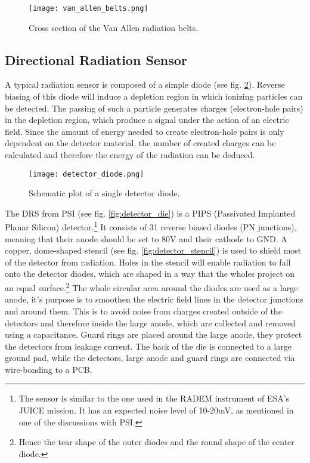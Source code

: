 \begin{figure}[H]
    \centering
    \texttt{[image: van\_allen\_belts.png]}
    \caption[Van Allen Radiation Belts]{Cross section of the Van Allen radiation belts.\cite{wikipedia2016vanallen}}
    \label{fig:van_allen_belts}
\end{figure}

\subsection{Directional Radiation Sensor}
\label{sec:radiation_sensor}
A typical radiation sensor is composed of a simple diode (see fig. \ref{fig:detector_diode}).
Reverse biasing of this diode will induce a depletion region in which ionizing particles can be detected.
The passing of such a particle generates charges (electron-hole pairs) in the depletion region, which produce a signal under the action of an electric field.
Since the amount of energy needed to create electron-hole pairs is only dependent on the detector material, the number of created charges can be calculated and therefore the energy of the radiation can be deduced.\cite{rossi2006pixel}

\begin{figure}[H]
    \centering
    \texttt{[image: detector\_diode.png]}
    \caption[Schematic Detector Diode]{Schematic plot of a single detector diode.\cite{am2016semiconductor}}
    \label{fig:detector_diode}
\end{figure}

The DRS from PSI (see fig. \ref{fig:detector_die}) is a PIPS (Passivated Implanted Planar Silicon) detector.\footnote{The sensor is similar to the one used in the RADEM instrument of ESA's JUICE mission. It has an expected noise level of 10-20mV, as mentioned in one of the discussions with PSI.}
It consists of 31 reverse biased diodes (PN junctions), meaning that their anode should be set to 80V and their cathode to GND.
A copper, dome-shaped stencil (see fig. \ref{fig:detector_stencil}) is used to shield most of the detector from radiation.
Holes in the stencil will enable radiation to fall onto the detector diodes, which are shaped in a way that the wholes project on an equal surface.\footnote{Hence the tear shape of the outer diodes and the round shape of the center diode.}
The whole circular area around the diodes are used as a large anode, it's purpose is to smoothen the electric field lines in the detector junctions and around them.
This is to avoid noise from charges created outside of the detectors and therefore inside the large anode, which are collected and removed using a capacitance.
Guard rings are placed around the large anode, they protect the detectors from leakage current.
The back of the die is connected to a large ground pad, while the detectors, large anode and guard rings are connected via wire-bonding to a PCB.

